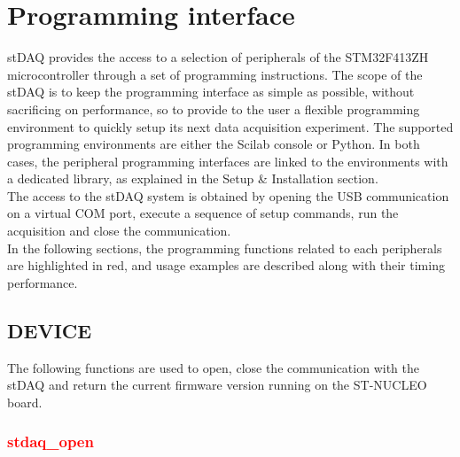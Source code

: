 \documentclass[letterpaper,10pt,english]{hitec}
\begin{document}
\newpage

\section{Programming interface}

stDAQ provides the access to a selection of peripherals of the STM32F413ZH microcontroller through a set of programming instructions. The scope of the stDAQ is to keep the programming interface as simple as possible, without sacrificing on performance, so to provide to the user a flexible programming environment to quickly setup its next data acquisition experiment. The supported programming environments are either the Scilab console or Python. In both cases, the peripheral programming interfaces are linked to the environments with a dedicated library, as explained in the Setup \& Installation section. \\
The access to the stDAQ system is obtained by opening the USB communication on a virtual COM port, execute a sequence of setup commands, run the acquisition and close the communication. \\
In the following sections, the programming functions related to each peripherals are highlighted in red, and usage examples are described along with their timing performance.

\subsection{DEVICE}

The following functions are used to open, close the communication with the stDAQ and return the current firmware version running on the ST-NUCLEO board.

\subsubsection{\textcolor{red}{stdaq\_open}}
\end{document}
